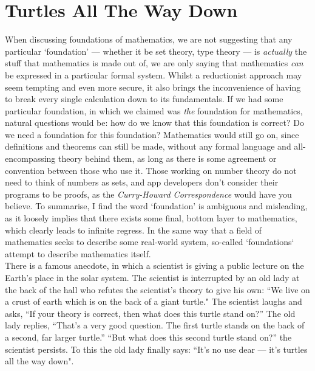 \documentclass[11pt]{report}
\theoremstyle{definition}
\theoremstyle{theorem}
\theoremstyle{lemma}
\begin{document}
\section{Turtles All The Way Down}
When discussing foundations of mathematics, we are not suggesting that any particular `foundation' --- whether it be set theory, type theory --- is \emph{actually} the stuff that mathematics is made out of, we are only saying that mathematics \emph{can} be expressed in a particular formal system. 
Whilst a reductionist approach may seem tempting and even more secure, it also brings the inconvenience of having to break every single calculation down to its fundamentals.
If we had some particular foundation, in which we claimed was \emph{the} foundation for mathematics, natural questions would be: how do we know that this foundation is correct? Do we need a foundation for this foundation? 
Mathematics would still go on, since definitions and theorems can still be made, without any formal language and all-encompassing theory behind them, as long as there is some agreement or convention between those who use it.
Those working on number theory do not need to think of numbers as sets, and app developers don't consider their programs to be proofs, as the \emph{Curry-Howard Correspondence} would have you believe. 
To summarise, I find the word `foundation' is ambiguous and misleading, as it loosely implies that there exists some final, bottom layer to mathematics, which clearly leads to infinite regress. 
In the same way that a field of mathematics seeks to describe some real-world system, so-called `foundations` attempt to describe mathematics itself.\\

\noindent
There is a famous anecdote, in which a scientist is giving a public lecture on the Earth's place in the solar system.
The scientist is interrupted by an old lady at the back of the hall who refutes the scientist's theory to give his own: 
``We live on a crust of earth which is on the back of a giant turtle."
The scientist laughs and asks, ``If your theory is correct, then what does this turtle stand on?''
The old lady replies, ``That's a very good question. The first turtle stands on the back of a second, far larger turtle.''
``But what does this second turtle stand on?'' the scientist persists.
To this the old lady finally says: 
``It's no use dear --- it's turtles all the way down".
\end{document}
